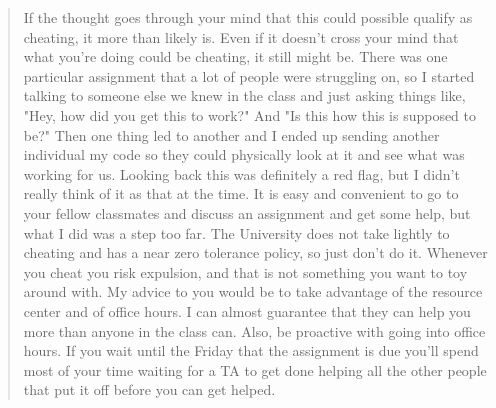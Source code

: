 \documentclass[12pt]{scrartcl}
\begin{document}
\begin{quote}
If the thought goes through your mind that this could possible qualify as 
cheating, it more than likely is. Even if it doesn't cross your mind that 
what you're doing could be cheating, it still might be. There was one 
particular assignment that a lot of people were struggling on, so I started 
talking to someone else we knew in the class and just asking things like, 
"Hey, how did you get this to work?" And "Is this how this is supposed to 
be?" Then one thing led to another and I ended up sending another individual 
my code so they could physically look at it and see what was working for us. 
Looking back this was definitely a red flag, but I didn't really think of 
it as that at the time. It is easy and convenient to go to your fellow 
classmates and discuss an assignment and get some help, but what I did 
was a step too far. The University does not take lightly to cheating and 
has a near zero tolerance policy, so just don't do it. Whenever you cheat 
you risk expulsion, and that is not something you want to toy around with.
My advice to you would be to take advantage of the resource center and of 
office hours. I can almost guarantee that they can help you more than anyone 
in the class can. Also, be proactive with going into office hours. If you 
wait until the Friday that the assignment is due you'll spend most of your 
time waiting for a TA to get done helping all the other people that put it 
off before you can get helped.
\end{quote}
\end{document}
